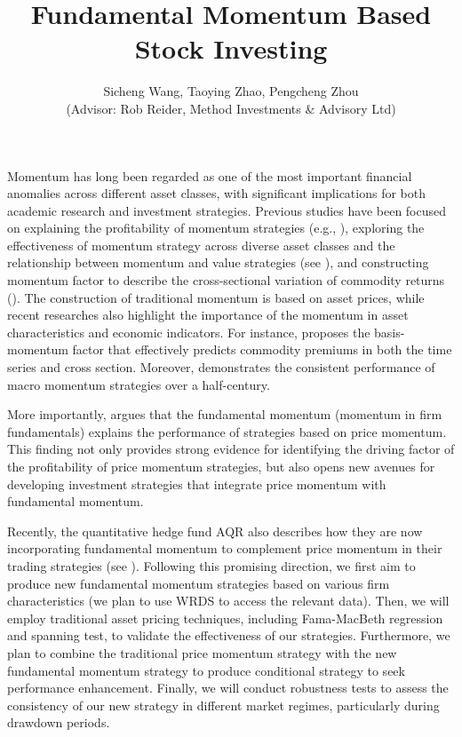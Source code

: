 \documentclass[12pt]{article}
\title{\textbf{Fundamental Momentum Based \\ Stock Investing}}
\author{
	 Sicheng Wang, Taoying Zhao, Pengcheng Zhou \\
	 (Advisor: Rob Reider, Method Investments \& Advisory Ltd)
	}
\begin{document}
	\maketitle

	Momentum has long been regarded as one of the most important financial anomalies across different asset classes, with significant implications for both academic research and investment strategies.
	Previous studies have been focused on explaining the profitability of momentum strategies (e.g., \cite{chan1996momentum}),
	 exploring the effectiveness of momentum strategy across diverse asset classes and the relationship between momentum and value strategies (see \cite{asness2013value}), 
	 and constructing momentum factor to describe the cross-sectional variation of commodity returns (\cite{bakshi2019understanding}).
	 The construction of traditional momentum is based on asset prices, while recent researches also highlight the importance of the momentum in asset characteristics and economic indicators.
	 For instance, \textcite{boons2019basis} proposes the basis-momentum factor that effectively predicts commodity premiums in both the time
	  series and cross section. Moreover, \textcite{brooks2017half} demonstrates the consistent performance of macro momentum strategies over a half-century.
	
	More importantly, \textcite{NBERw20984} argues that the fundamental momentum (momentum in firm fundamentals) explains the performance of strategies based on 
	price momentum. This finding not only provides strong evidence for identifying the driving factor of the profitability of price momentum strategies, 
	but also opens new avenues for developing investment strategies that integrate price momentum with fundamental momentum.

	Recently, the quantitative hedge fund AQR also describes how they are now incorporating fundamental momentum to complement price momentum in their trading strategies (see \cite{brooks2024economic}).
	Following this promising direction, we first aim to produce new fundamental momentum strategies based on various firm characteristics (we plan to use WRDS to access the relevant data). 
	Then, we will employ traditional asset pricing techniques, including Fama-MacBeth regression and spanning test,
	 to validate the effectiveness of our strategies. Furthermore, we plan to combine the traditional price momentum strategy with the new fundamental momentum strategy to produce conditional strategy to seek performance enhancement.
	  Finally, we will conduct robustness tests to assess the consistency of our new strategy in different market regimes, particularly during drawdown periods.


	\newpage
	\printbibliography
\end{document}

